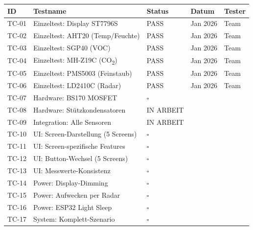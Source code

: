 \documentclass[a4paper,11pt]{article}
\begin{document}
\begin{longtable}{p{1cm} p{5.5cm} p{2.5cm} p{2cm} p{2cm}}
\toprule
\rowcolor{tableheader}
\textbf{ID} & \textbf{Testname} & \textbf{Status} & \textbf{Datum} & \textbf{Tester} \\
\midrule
\endhead
TC-01 & Einzeltest: Display ST7796S           & \textcolor{pass}{PASS}    & Jan 2026 & Team \\
TC-02 & Einzeltest: AHT20 (Temp/Feuchte)      & \textcolor{pass}{PASS}    & Jan 2026 & Team \\
TC-03 & Einzeltest: SGP40 (VOC)               & \textcolor{pass}{PASS}    & Jan 2026 & Team \\
TC-04 & Einzeltest: MH-Z19C (CO\textsubscript{2}) & \textcolor{pass}{PASS} & Jan 2026 & Team \\
TC-05 & Einzeltest: PMS5003 (Feinstaub)        & \textcolor{pass}{PASS}    & Jan 2026 & Team \\
TC-06 & Einzeltest: LD2410C (Radar)            & \textcolor{pass}{PASS}    & Jan 2026 & Team \\
TC-07 & Hardware: BS170 MOSFET                 & $\square$                  &          & \\
TC-08 & Hardware: Stützkondensatoren           & \textcolor{warn}{IN ARBEIT} &        & \\
TC-09 & Integration: Alle Sensoren             & \textcolor{warn}{IN ARBEIT} &        & \\
TC-10 & UI: Screen-Darstellung (5 Screens)     & $\square$                  &          & \\
TC-11 & UI: Screen-spezifische Features        & $\square$                  &          & \\
TC-12 & UI: Button-Wechsel (5 Screens)         & $\square$                  &          & \\
TC-13 & UI: Messwerte-Konsistenz               & $\square$                  &          & \\
TC-14 & Power: Display-Dimming                 & $\square$                  &          & \\
TC-15 & Power: Aufwecken per Radar             & $\square$                  &          & \\
TC-16 & Power: ESP32 Light Sleep               & $\square$                  &          & \\
TC-17 & System: Komplett-Szenario              & $\square$                  &          & \\
\bottomrule
\end{longtable}
\end{document}

